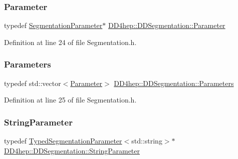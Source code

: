 \subsubsection{\texorpdfstring{Parameter}{Parameter}}
{\footnotesize\ttfamily typedef \hyperlink{class_d_d4hep_1_1_d_d_segmentation_1_1_segmentation_parameter}{Segmentation\+Parameter}$\ast$ \hyperlink{namespace_d_d4hep_1_1_d_d_segmentation_af6c6bad2a745d807a0ed00506fb34ccf}{D\+D4hep\+::\+D\+D\+Segmentation\+::\+Parameter}}



Definition at line 24 of file Segmentation.\+h.

\hypertarget{namespace_d_d4hep_1_1_d_d_segmentation_af38026430ca0e1ef64acdfc898f5dd3d}{}\label{namespace_d_d4hep_1_1_d_d_segmentation_af38026430ca0e1ef64acdfc898f5dd3d} 
\subsubsection{\texorpdfstring{Parameters}{Parameters}}
{\footnotesize\ttfamily typedef std\+::vector$<$\hyperlink{namespace_d_d4hep_1_1_d_d_segmentation_af6c6bad2a745d807a0ed00506fb34ccf}{Parameter}$>$ \hyperlink{namespace_d_d4hep_1_1_d_d_segmentation_af38026430ca0e1ef64acdfc898f5dd3d}{D\+D4hep\+::\+D\+D\+Segmentation\+::\+Parameters}}



Definition at line 25 of file Segmentation.\+h.

\hypertarget{namespace_d_d4hep_1_1_d_d_segmentation_a43a80cf70a60b3c858aca4fa463d8f7c}{}\label{namespace_d_d4hep_1_1_d_d_segmentation_a43a80cf70a60b3c858aca4fa463d8f7c} 
\subsubsection{\texorpdfstring{String\+Parameter}{StringParameter}}
{\footnotesize\ttfamily typedef \hyperlink{class_d_d4hep_1_1_d_d_segmentation_1_1_typed_segmentation_parameter}{Typed\+Segmentation\+Parameter}$<$std\+::string$>$$\ast$ \hyperlink{namespace_d_d4hep_1_1_d_d_segmentation_a43a80cf70a60b3c858aca4fa463d8f7c}{D\+D4hep\+::\+D\+D\+Segmentation\+::\+String\+Parameter}}



